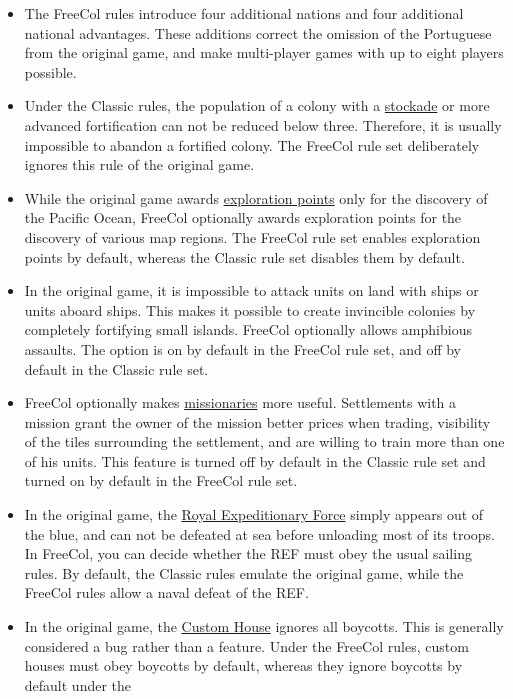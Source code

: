 \documentclass[12pt]{book}
\begin{document}
\begin{itemize}
\item The FreeCol rules introduce four additional nations and four
  additional national advantages. These additions correct the omission
  of the Portuguese from the original game, and make multi-player
  games with up to eight players possible.
\item Under the Classic rules, the population of a colony with a
  \hyperlink{Stockade}{stockade} or more advanced fortification can
  not be reduced below three. Therefore, it is usually impossible to
  abandon a fortified colony. The FreeCol rule set deliberately
  ignores this rule of the original game.
\item While the original game awards
  \hyperlink{Exploration}{exploration points} only for the discovery
  of the Pacific Ocean, FreeCol optionally awards exploration points
  for the discovery of various map regions. The FreeCol rule set
  enables exploration points by default, whereas the Classic rule set
  disables them by default.
\item In the original game, it is impossible to attack units on land
  with ships or units aboard ships. This makes it possible to create
  invincible colonies by completely fortifying small islands. FreeCol
  optionally allows amphibious assaults. The option is on by default
  in the FreeCol rule set, and off by default in the Classic rule set.
\item FreeCol optionally makes \hyperlink{Missionary}{missionaries}
  more useful. Settlements with a mission grant the owner of the
  mission better prices when trading, visibility of the tiles
  surrounding the settlement, and are willing to train more
  than one of his units. This feature is turned off by default in the
  Classic rule set and turned on by default in the FreeCol rule set.
\item In the original game, the \hyperlink{Royal Expeditionary
  Force}{Royal Expeditionary Force} simply appears out of the blue,
  and can not be defeated at sea before unloading most of its
  troops. In FreeCol, you can decide whether the REF must obey the
  usual sailing rules. By default, the Classic rules emulate the
  original game, while the FreeCol rules allow a naval defeat of the
  REF.
\item In the original game, the \hyperlink{Custom House}{Custom House}
  ignores all boycotts. This is generally considered a bug rather than
  a feature. Under the FreeCol rules, custom houses must obey boycotts
  by default, whereas they ignore boycotts by default under the

\end{itemize}
\end{document}
